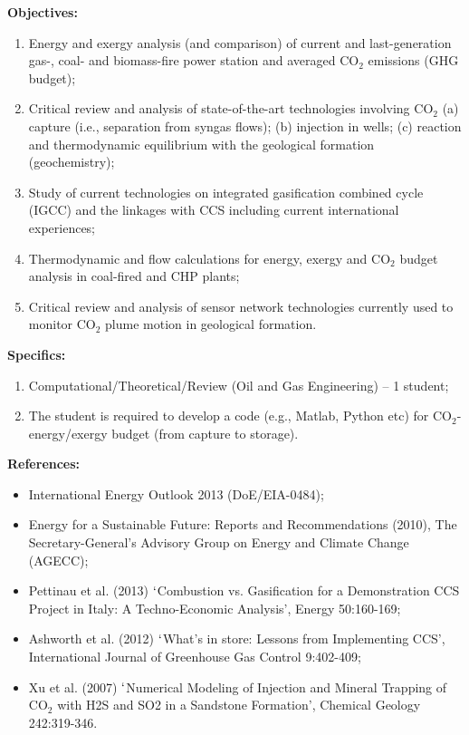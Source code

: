 \documentclass[12pts,a4paper,amsmath,amssymb,floatfix]{article}%
\begin{document}
\begin{enumerate}[label=\bfseries Project:]
\noindent
{\bf Objectives:}
\begin{enumerate}
\item Energy and exergy analysis (and comparison) of current and last-generation gas-, coal- and biomass-fire power station and averaged CO$_{2}$ emissions (GHG budget);
\item Critical review and analysis of state-of-the-art technologies involving CO$_{2}$ (a) capture (i.e., separation from syngas flows); (b) injection in wells; (c) reaction and thermodynamic equilibrium with the geological formation (geochemistry);
\item Study of current technologies on integrated gasification combined cycle (IGCC) and the linkages with CCS including current international experiences;
\item Thermodynamic and flow calculations for energy, exergy and CO$_{2}$ budget analysis in coal-fired and CHP plants;
\item Critical review and analysis of sensor network technologies currently used to monitor CO$_{2}$ plume motion in geological formation.
\end{enumerate}

\noindent
{\bf Specifics:} 
\begin{enumerate}
\item Computational/Theoretical/Review (Oil and Gas Engineering) -- 1 student;
\item The student is required to develop a code (e.g., Matlab, Python etc) for CO$_{2}$-energy/exergy budget (from capture to storage).
\end{enumerate}

\noindent
{\bf References:}
\begin{itemize}
\item International Energy Outlook 2013 (DoE/EIA-0484);
\item Energy for a Sustainable Future: Reports and Recommendations (2010), The Secretary-General’s Advisory Group on Energy and Climate Change (AGECC);
\item Pettinau et al. (2013) $\lq$Combustion vs. Gasification for a Demonstration CCS Project in Italy: A Techno-Economic Analysis’, Energy 50:160-169;
\item Ashworth et al. (2012) $\lq$What’s in store: Lessons from Implementing CCS’, International Journal of Greenhouse Gas Control 9:402-409;
\item Xu et al. (2007) $\lq$Numerical Modeling of Injection and Mineral Trapping of CO$_{2}$ with H2S and SO2 in a Sandstone Formation’, Chemical Geology 242:319-346.
\end{itemize}


\end{enumerate}
\end{document}
